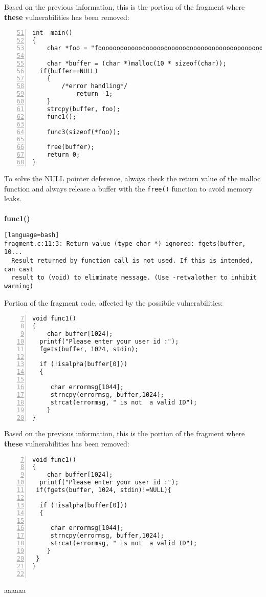 \documentclass[a4paper,12pt]{article}
\begin{document}
\newpage
\noindent
Based on the previous information, this is the portion of the fragment where \textbf{these} vulnerabilities has been removed:
\begin{lstlisting}[style=c,numbers=left,firstnumber=51,linebackgroundcolor={
\ifnum\value{lstnumber}=56\color{green}\fi
\ifnum\value{lstnumber}=66\color{green}\fi}]
int  main()
{
	char *foo = "fooooooooooooooooooooooooooooooooooooooooooooooooooo";
	
	char *buffer = (char *)malloc(10 * sizeof(char));
  if(buffer==NULL)
	{
	    /*error handling*/
     	    return -1;
	}
	strcpy(buffer, foo);
	func1();
   
	func3(sizeof(*foo));
	
	free(buffer);
	return 0;
}

\end{lstlisting}
To solve the NULL pointer deference, always check the return value of the malloc function and always release a buffer with the \texttt{free()} function to avoid memory leaks.\\\\


\noindent
\textbf{func1()}\\

\begin{lstlisting}[style=DOS][language=bash]
fragment.c:11:3: Return value (type char *) ignored: fgets(buffer, 10...
  Result returned by function call is not used. If this is intended, can cast
  result to (void) to eliminate message. (Use -retvalother to inhibit warning)
\end{lstlisting}

Portion of the fragment code, affected by the possibile vulnerabilities:
\begin{lstlisting}[style=c,numbers=left,firstnumber=7,linebackgroundcolor={
\ifnum\value{lstnumber}=11\color{red}\fi
}]
void func1()
{	
	char buffer[1024];
  printf("Please enter your user id :");
  fgets(buffer, 1024, stdin);
 
  if (!isalpha(buffer[0]))
  {

     char errormsg[1044];
     strncpy(errormsg, buffer,1024);
     strcat(errormsg, " is not  a valid ID");
 	}
}
\end{lstlisting}

\noindent
Based on the previous information, this is the portion of the fragment where \textbf{these} vulnerabilities has been removed:
\begin{lstlisting}[style=c,numbers=left,firstnumber=7,linebackgroundcolor={
\ifnum\value{lstnumber}=11\color{green}\fi}]
void func1()
{	
	char buffer[1024];
  printf("Please enter your user id :");
 if(fgets(buffer, 1024, stdin)!=NULL){
 
  if (!isalpha(buffer[0]))
  {

     char errormsg[1044];
     strncpy(errormsg, buffer,1024);
     strcat(errormsg, " is not  a valid ID");
 	}
 }
}


\end{lstlisting}
aaaaaa\\\\\\
\end{document}
